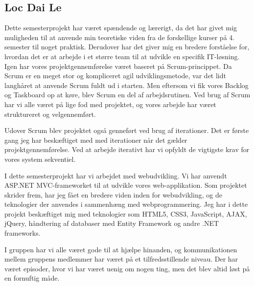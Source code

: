\subsection*{Loc Dai Le}

Dette semesterprojekt har været spændende og lærerigt, da det har givet mig muligheden til at anvende min teoretiske viden fra de forskellige kurser på 4. semester til noget praktisk. Derudover har det giver mig en bredere forståelse for, hvordan det er at arbejde i et større team til at udvikle en specifik IT-løsning. 
Igen har vores projektgennemførelse været baseret på Scrum-princippet. Da Scrum er en meget stor og kompliceret agil udviklingsmetode, var det lidt langhåret at anvende Scrum fuldt ud i starten. Men eftersom vi fik vores Backlog og Taskboard op at køre, blev Scrum en del af arbejdsrutinen.   
Ved brug af Scrum har vi alle været på lige fod med projektet, og vores arbejde har været struktureret og velgennemført.

Udover Scrum blev projektet også genneført ved brug af iterationer. Det er første gang jeg har beskæftiget med med iterationer når det gælder projektgennemførelse. Ved at arbejde iterativt har vi opfyldt de vigtigste krav for vores system sekventiel. 

I dette semesterprojekt har vi arbejdet med webudvikling. Vi har anvendt ASP.NET MVC-frameworket til at udvikle vores web-applikation. Som projektet skrider frem, har jeg fået en bredere viden inden for webudvikling, og de teknologier der anvendes i sammenhæng med webprogrammering. Jeg har i dette projekt beskæftiget mig med teknologier som HTML5, CSS3, JavaScript, AJAX, jQuery, håndtering af databaser med Entity Framework og andre .NET frameworks. 


I gruppen har vi alle været gode til at hjælpe hinanden, og kommunikationen mellem gruppens medlemmer har været på et tilfredsstillende niveau. Der har været episoder, hvor vi har været uenig om nogen ting, men det blev altid løst på en fornuftig måde. 